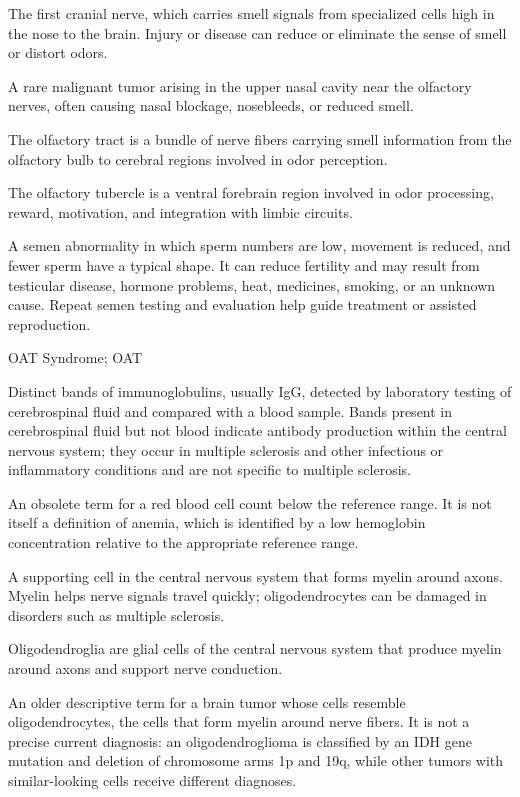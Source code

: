  The first cranial nerve, which carries smell signals from specialized cells high in the nose to the brain. Injury or disease can reduce or eliminate the sense of smell or distort odors.

 A rare malignant tumor arising in the upper nasal cavity near the olfactory nerves, often causing nasal blockage, nosebleeds, or reduced smell.

 The olfactory tract is a bundle of nerve fibers carrying smell information from the olfactory bulb to cerebral regions involved in odor perception.

 The olfactory tubercle is a ventral forebrain region involved in odor processing, reward, motivation, and integration with limbic circuits.

 A semen abnormality in which sperm numbers are low, movement is reduced, and fewer sperm have a typical shape. It can reduce fertility and may result from testicular disease, hormone problems, heat, medicines, smoking, or an unknown cause. Repeat semen testing and evaluation help guide treatment or assisted reproduction.

\synonyms
OAT Syndrome; OAT

 Distinct bands of immunoglobulins, usually IgG, detected by laboratory testing of cerebrospinal fluid and compared with a blood sample. Bands present in cerebrospinal fluid but not blood indicate antibody production within the central nervous system; they occur in multiple sclerosis and other infectious or inflammatory conditions and are not specific to multiple sclerosis.

 An obsolete term for a red blood cell count below the reference range. It is not itself a definition of anemia, which is identified by a low hemoglobin concentration relative to the appropriate reference range.

 A supporting cell in the central nervous system that forms myelin around axons. Myelin helps nerve signals travel quickly; oligodendrocytes can be damaged in disorders such as multiple sclerosis.

 Oligodendroglia are glial cells of the central nervous system that produce myelin around axons and support nerve conduction.

 An older descriptive term for a brain tumor whose cells resemble oligodendrocytes, the cells that form myelin around nerve fibers. It is not a precise current diagnosis: an oligodendroglioma is classified by an IDH gene mutation and deletion of chromosome arms 1p and 19q, while other tumors with similar-looking cells receive different diagnoses.

